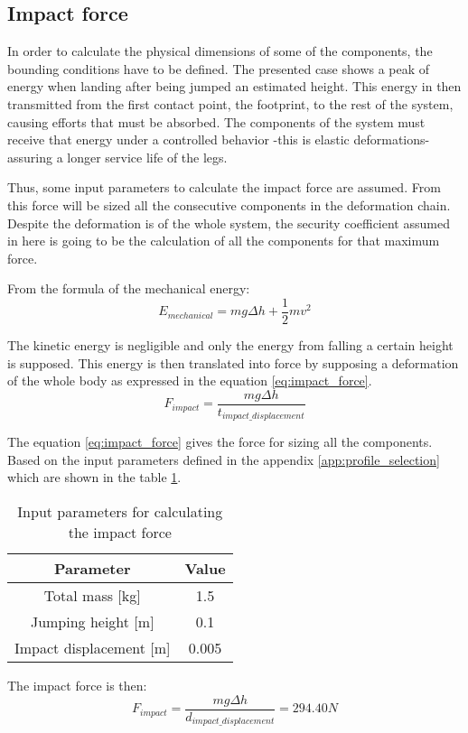 \subsection{Impact force} %
\label{sub:impact_force}
In order to calculate the physical dimensions of some of the components, the bounding conditions have to be defined.
The presented case shows a peak of energy when landing after being jumped an estimated height.
This energy in then transmitted from the first contact point, the footprint, to the rest of the system, causing efforts that must be absorbed.
The components of the system must receive that energy under a controlled behavior -this is elastic deformations- assuring a longer service life of the legs.

Thus, some input parameters to calculate the impact force are assumed.
From this force will be sized all the consecutive components in the deformation chain.
Despite the deformation is of the whole system, the security coefficient assumed in here is going to be the calculation of all the components for that maximum force.

From the formula of the mechanical energy:
\begin{equation}
  E_{mechanical} = m g \Delta h + \frac{1}{2} m v^{2}
\end{equation}

The kinetic energy is negligible and only the energy from falling a certain height is supposed.
This energy is then translated into force by supposing a deformation of the whole body as expressed in the equation \ref{eq:impact_force}.
\begin{equation}
\label{eq:impact_force}
  F_{impact} = \frac{m g \Delta h}{t_{impact\_displacement}}
\end{equation}

The equation \ref{eq:impact_force} gives the force for sizing all the components.
Based on the input parameters defined in the appendix \ref{app:profile_selection} which are shown in the table \ref{tab:input_parameter_impact_force}.
\begin{table}
\begin{center}
\begin{tabular}{c | c}
  Parameter & Value \\
  \hline
  Total mass [kg] & 1.5 \\
  Jumping height [m] & 0.1 \\
  Impact displacement [m] & 0.005
\end{tabular}
\caption{Input parameters for calculating the impact force}
\label{tab:input_parameter_impact_force}
\end{center}
\end{table}

The impact force is then:
\begin{equation}
  F_{impact} = \frac{m g \Delta h}{d_{impact\_displacement}} = 294.40 N 
\end{equation}
